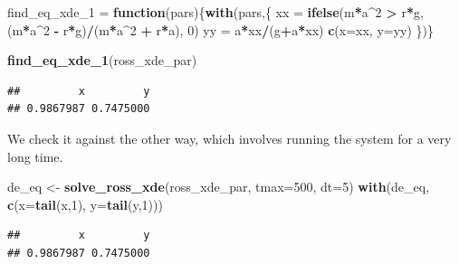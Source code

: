 \documentclass[
]{book}
\newenvironment{Shaded}{\begin{snugshade}}{\end{snugshade}}
\newcommand{\AttributeTok}[1]{\textcolor[rgb]{0.13,0.29,0.53}{#1}}
\newcommand{\ControlFlowTok}[1]{\textcolor[rgb]{0.13,0.29,0.53}{\textbf{#1}}}
\newcommand{\DecValTok}[1]{\textcolor[rgb]{0.00,0.00,0.81}{#1}}
\newcommand{\FunctionTok}[1]{\textcolor[rgb]{0.13,0.29,0.53}{\textbf{#1}}}
\newcommand{\NormalTok}[1]{#1}
\newcommand{\OtherTok}[1]{\textcolor[rgb]{0.56,0.35,0.01}{#1}}
\newcommand{\SpecialCharTok}[1]{\textcolor[rgb]{0.81,0.36,0.00}{\textbf{#1}}}
\begin{document}
\begin{Shaded}
\begin{Highlighting}[]
\NormalTok{find\_eq\_xde\_1 }\OtherTok{=} \ControlFlowTok{function}\NormalTok{(pars)\{}\FunctionTok{with}\NormalTok{(pars,\{}
\NormalTok{  xx }\OtherTok{=} \FunctionTok{ifelse}\NormalTok{(m}\SpecialCharTok{*}\NormalTok{a}\SpecialCharTok{\^{}}\DecValTok{2} \SpecialCharTok{\textgreater{}}\NormalTok{ r}\SpecialCharTok{*}\NormalTok{g, (m}\SpecialCharTok{*}\NormalTok{a}\SpecialCharTok{\^{}}\DecValTok{2} \SpecialCharTok{{-}}\NormalTok{ r}\SpecialCharTok{*}\NormalTok{g)}\SpecialCharTok{/}\NormalTok{(m}\SpecialCharTok{*}\NormalTok{a}\SpecialCharTok{\^{}}\DecValTok{2} \SpecialCharTok{+}\NormalTok{ r}\SpecialCharTok{*}\NormalTok{a), }\DecValTok{0}\NormalTok{) }
\NormalTok{  yy }\OtherTok{=}\NormalTok{ a}\SpecialCharTok{*}\NormalTok{xx}\SpecialCharTok{/}\NormalTok{(g}\SpecialCharTok{+}\NormalTok{a}\SpecialCharTok{*}\NormalTok{xx)}
  \FunctionTok{c}\NormalTok{(}\AttributeTok{x=}\NormalTok{xx, }\AttributeTok{y=}\NormalTok{yy)}
\NormalTok{\})\}}
\end{Highlighting}
\end{Shaded}

\begin{Shaded}
\begin{Highlighting}[]
\FunctionTok{find\_eq\_xde\_1}\NormalTok{(ross\_xde\_par)}
\end{Highlighting}
\end{Shaded}

\begin{verbatim}
##         x         y 
## 0.9867987 0.7475000
\end{verbatim}

We check it against the other way, which involves running the system for a very long time.

\begin{Shaded}
\begin{Highlighting}[]
\NormalTok{de\_eq }\OtherTok{\textless{}{-}} \FunctionTok{solve\_ross\_xde}\NormalTok{(ross\_xde\_par, }\AttributeTok{tmax=}\DecValTok{500}\NormalTok{, }\AttributeTok{dt=}\DecValTok{5}\NormalTok{)}
\FunctionTok{with}\NormalTok{(de\_eq, }\FunctionTok{c}\NormalTok{(}\AttributeTok{x=}\FunctionTok{tail}\NormalTok{(x,}\DecValTok{1}\NormalTok{), }\AttributeTok{y=}\FunctionTok{tail}\NormalTok{(y,}\DecValTok{1}\NormalTok{))) }
\end{Highlighting}
\end{Shaded}

\begin{verbatim}
##         x         y 
## 0.9867987 0.7475000
\end{verbatim}
\end{document}
